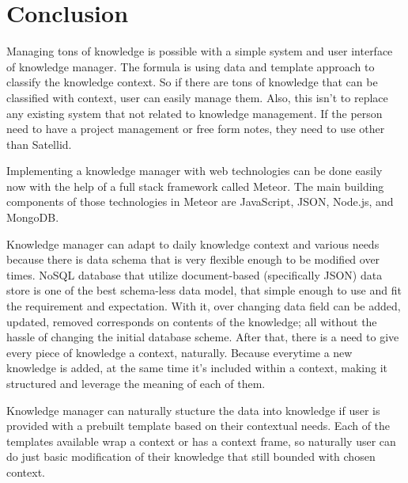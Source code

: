 \section{Conclusion}
\label{sec:conclusion}

Managing tons of knowledge is possible with a simple system and user interface of knowledge manager.
The formula is using data and template approach to classify the knowledge context.
So if there are tons of knowledge that can be classified with context, user can easily manage them.
Also, this isn't to replace any existing system that not related to knowledge management.
If the person need to have a project management or free form notes, they need to use other than Satellid.

Implementing a knowledge manager with web technologies can be done easily now with the help of a full stack framework called Meteor.
The main building components of those technologies in Meteor are JavaScript, JSON, Node.js, and MongoDB.

Knowledge manager can adapt to daily knowledge context and various needs because there is data schema that is very flexible enough to be modified over times.
\ac{NoSQL} database that utilize document-based (specifically \ac{JSON}) data store is one of the best schema-less data model, that simple enough to use and fit the requirement and expectation.
With it, over changing data field can be added, updated, removed corresponds on contents of the knowledge; all without the hassle of changing the initial database scheme.
After that, there is a need to give every piece of knowledge a context, naturally.
Because everytime a new knowledge is added, at the same time it's included within a context, making it structured and leverage the meaning of each of them.

Knowledge manager can naturally stucture the data into knowledge if user is provided with a prebuilt template based on their contextual needs.
Each of the templates available wrap a context or has a context frame, so naturally user can do just basic modification of their knowledge that still bounded with chosen context.
